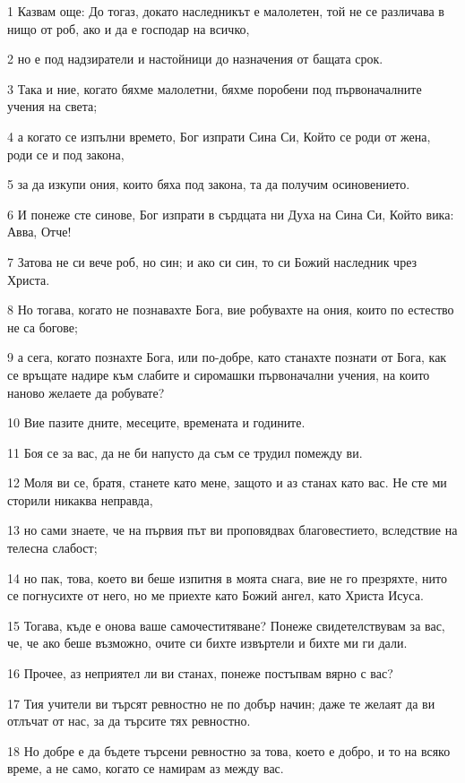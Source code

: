 \par 1 Казвам още: До тогаз, докато наследникът е малолетен, той не се различава в нищо от роб, ако и да е господар на всичко,
\par 2 но е под надзиратели и настойници до назначения от бащата срок.
\par 3 Така и ние, когато бяхме малолетни, бяхме поробени под първоначалните учения на света;
\par 4 а когато се изпълни времето, Бог изпрати Сина Си, Който се роди от жена, роди се и под закона,
\par 5 за да изкупи ония, които бяха под закона, та да получим осиновението.
\par 6 И понеже сте синове, Бог изпрати в сърдцата ни Духа на Сина Си, Който вика: Авва, Отче!
\par 7 Затова не си вече роб, но син; и ако си син, то си Божий наследник чрез Христа.
\par 8 Но тогава, когато не познавахте Бога, вие робувахте на ония, които по естество не са богове;
\par 9 а сега, когато познахте Бога, или по-добре, като станахте познати от Бога, как се връщате надире към слабите и сиромашки първоначални учения, на които наново желаете да робувате?
\par 10 Вие пазите дните, месеците, времената и годините.
\par 11 Боя се за вас, да не би напусто да съм се трудил помежду ви.
\par 12 Моля ви се, братя, станете като мене, защото и аз станах като вас. Не сте ми сторили никаква неправда,
\par 13 но сами знаете, че на първия път ви проповядвах благовестието, вследствие на телесна слабост;
\par 14 но пак, това, което ви беше изпитня в моята снага, вие не го презряхте, нито се погнусихте от него, но ме приехте като Божий ангел, като Христа Исуса.
\par 15 Тогава, къде е онова ваше самочеститяване? Понеже свидетелствувам за вас, че, че ако беше възможно, очите си бихте извъртели и бихте ми ги дали.
\par 16 Прочее, аз неприятел ли ви станах, понеже постъпвам вярно с вас?
\par 17 Тия учители ви търсят ревностно не по добър начин; даже те желаят да ви отлъчат от нас, за да търсите тях ревностно.
\par 18 Но добре е да бъдете търсени ревностно за това, което е добро, и то на всяко време, а не само, когато се намирам аз между вас.
